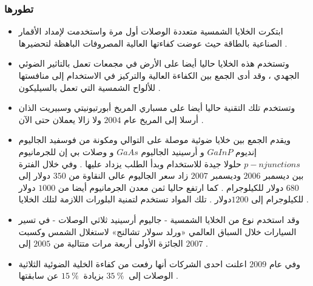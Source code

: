 \subsubsection{تطورها}
\begin{itemize}
\item 

ابتكرت الخلايا الشمسية متعددة الوصلات أول مرة واستخدمت لإمداد الأقمار الصناعية بالطاقة حيث عوضت كفاءتها العالية المصروفات الباهظة لتحضيرها .
\item
وتستخدم هذه الخلايا حاليا أيضا على الأرض في مجمعات تعمل بالتاثير الضوئي الجهدي ، وقد أدى الجمع بين الكفاءة العالية والتركيز في الاستخدام إلى منافستها للألواح الشمسية التي تعمل بالسيليكون .
\item
وتستخدم تلك التقنية حاليا أيضا على مسباري المريخ أبورتيونيتي وسبيريت الذان أرسلا إلى المريخ عام $ 2004 $ ولا زالا يعملان حتى الآن .
\item
ويقدم الجمع بين خلايا ضوئية موصلة على التوالي ومكونة من فوسفيد الجاليوم إنديوم $ GaInP $ و أرسينيد الجاليوم $ GaAs $ و وصلات بي إن للجرمانيوم $ p-n junctions $ حلولا جيدة للاستخدام وبدأ الطلب يزداد عليها . وفي خلال الفترة بين ديسمبر $ 2006 $ وديسمبر $ 2007 $ زاد سعر الجاليوم عالى النقاوة من $ 350 $ دولار إلى $ 680 $ دولار للكيلوجرام . كما ارتفع حاليا ثمن معدن الجرمانيوم أيضا من $ 1000 $ دولار للكيلوجرام إلى $ 1200  $دولار . تلك المواد تستخدم لتمنية البلورات اللازمة لتلك الخلايا .
\item
وقد استخدم نوع من الخلايا الشمسية - جاليوم أرسينيد ثلاثي الوصلات - في تسير السيارات خلال السباق العالمي «ورلد سولار تشالنج» لاستغلال الشمس وكسبت الجائزة الأولى أربعة مرات متتالية من $ 2005 $ إلى $ 2007 $ .
\item
وفي عام $ 2009 $ اعلنت احدى الشركات أنها رفعت من كفاءة الخلية الضوئية الثلاثية الوصلات إلى $ 35 ~\%~ $ بزيادة $ 15 ~\%~ $ عن سابقتها .
\end{itemize} 
